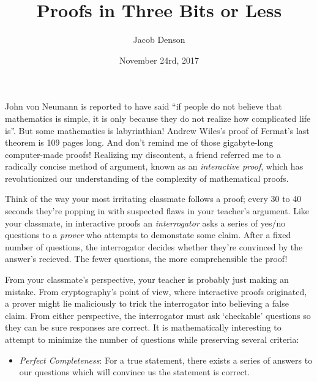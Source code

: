 \documentclass{article}
\title{Proofs in Three Bits or Less}
\author{Jacob Denson}
\date{November 24rd, 2017}
\theoremstyle{plain}
\theoremstyle{remark}
\theoremstyle{definition}
\begin{document}
\maketitle



\begin{multicols}{2}
John von Neumann is reported to have said ``if people do not believe that mathematics is simple, it is only because they do not realize how complicated life is''. But some mathematics is labyrinthian! Andrew Wiles's proof of Fermat's last theorem is 109 pages long. And don’t remind me of those gigabyte-long computer-made proofs! Realizing my discontent, a friend referred me to a radically concise method of argument, known as an {\it interactive proof}, which has revolutionized our understanding of the complexity of mathematical proofs.

Think of the way your most irritating classmate follows a proof; every 30 to 40 seconds they're popping in with suspected flaws in your teacher's argument. Like your classmate, in interactive proofs an {\it interrogator} asks a series of yes/no questions to a {\it prover} who attempts to demonstate some claim. After a fixed number of questions, the interrogator decides whether they're convinced by the answer's recieved. The fewer questions, the more comprehensible the proof!


From your classmate's perspective, your teacher is probably just making an mistake. From cryptography's point of view, where interactive proofs originated, a prover might lie maliciously to trick the interrogator into believing a false claim. From either perspective, the interrogator must ask `checkable' questions so they can be sure responses are correct. It is mathematically interesting to attempt to minimize the number of questions while preserving several criteria:
%
\begin{itemize}
    \item {\it Perfect Completeness}: For a true statement, there exists a series of answers to our questions which will convince us the statement is correct.


\end{itemize}
\end{multicols}
\end{document}
